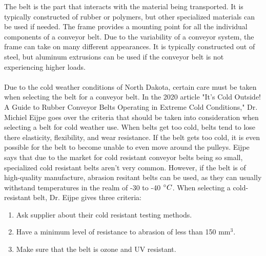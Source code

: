 \documentclass[10pt]{project}
\begin{document}
\noindent The belt is the part that interacts with the material being transported. 
 It is typically constructed of rubber or polymers, but other specialized materials can be used if needed.  The frame provides a mounting point for all the individual components of a conveyor belt.  Due to the variability of a conveyor system, the frame can take on many different appearances.  It is typically constructed out of steel, but aluminum extrusions can be used if the conveyor belt is not experiencing higher loads.\\\\
\noindent Due to the cold weather conditions of North Dakota, certain care must be taken when selecting the belt for a conveyor belt.  In the 2020 article "It's Cold Outside!  A Guide to Rubber Conveyor Belts Operating in Extreme Cold Conditions," Dr. Michiel Eijpe goes over the criteria that should be taken into consideration when selecting a belt for cold weather use\cite{marcel}.  When belts get too cold, belts tend to lose there elasticity, flexibility, and wear resistance.  If the belt gets too cold, it is even possible for the belt to become unable to even move around the pulleys. Eijpe says that due to the market for cold resistant conveyor belts being so small, specialized cold resistant belts aren't very common.  However, if the belt is of high-quality manufacture, abrasion resitant belts can be used, as they can usually withstand temperatures in the realm of -30 to -40 $\degree C$.  When selecting a cold-resistant belt, Dr. Eijpe gives three criteria:
\begin{enumerate}
    \item Ask supplier about their cold resistant testing methods.
    \item Have a minimum level of resistance to abrasion of less than 150 mm$^3$.
    \item Make sure that the belt is ozone and UV resistant.
\end{enumerate}



\end{document}
